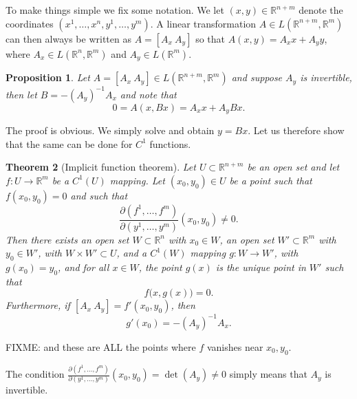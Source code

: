 \documentclass[12pt]{book}
\newcommand{\R}{{\mathbb{R}}}
\theoremstyle{plain}
\newtheorem{thm}{Theorem}[section]
\newtheorem{prop}[thm]{Proposition}
\theoremstyle{remark}
\theoremstyle{definition}
\theoremstyle{exercise}
\theoremstyle{example}
\begin{document}
To make things simple we fix some notation.  We let $(x,y) \in
\R^{n+m}$ denote the coordinates $(x^1,\ldots,x^n,y^1,\ldots,y^m)$.  A
linear transformation $A \in L(\R^{n+m},\R^m)$ can then always
be written as
$A = [ A_x ~ A_y ]$ so that $A(x,y) = A_x x + A_y y$,
where $A_x \in L(\R^n,\R^m)$ and
$A_y \in L(\R^m)$.

\begin{prop}
Let $A = [A_x~A_y] \in L(\R^{n+m},\R^m)$ and suppose 
$A_y$ is invertible, then let $B = - {(A_y)}^{-1} A_x$ and note that
\begin{equation*}
0 = A ( x, Bx) = A_x x + A_y Bx .
\end{equation*}
\end{prop}

The proof is obvious.  We simply solve and obtain $y = Bx$.  Let us
therefore show that the same can be done for $C^1$ functions.

\begin{thm}[Implicit function theorem]
\label{thm:implicit}
Let $U \subset \R^{n+m}$ be an open set and let $f \colon U \to \R^m$
be a $C^1(U)$ mapping.  Let $(x_0,y_0) \in U$ be a point such that
$f(x_0,y_0) = 0$ and such that
\begin{equation*}
\frac{\partial(f^1,\ldots,f^m)}{\partial(y^1,\ldots,y^m)} (x_0,y_0)  \neq 0 .
\end{equation*}
Then there exists an
open set $W \subset \R^n$ with $x_0 \in W$,
an open set $W' \subset \R^m$ with $y_0 \in W'$,
with $W \times W' \subset U$,
and
a $C^1(W)$ mapping $g \colon W \to W'$, with $g(x_0) = y_0$, and
for all $x \in W$, the point $g(x)$ is the unique point in $W'$
such that 
\begin{equation*}
f\bigl(x,g(x)\bigr) = 0 .
\end{equation*}
Furthermore, if $[ A_x ~ A_y ] = f'(x_0,y_0)$, then
\begin{equation*}
g'(x_0) = -{(A_y)}^{-1}A_x .
\end{equation*}
\end{thm}

FIXME: and these are ALL the points where $f$ vanishes near $x_0,y_0$.

The condition
$\frac{\partial(f^1,\ldots,f^m)}{\partial(y^1,\ldots,y^m)} (x_0,y_0) =
\det(A_y)  \neq 0$
simply means that $A_y$ is invertible.
\end{document}
